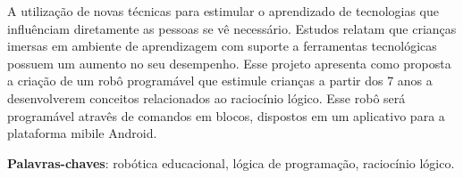 \begin{resumo}
A utilização de novas técnicas para estimular o aprendizado de tecnologias que influênciam diretamente as pessoas se vê necessário. Estudos relatam que crianças imersas em ambiente de aprendizagem com suporte a ferramentas tecnológicas possuem um aumento no seu desempenho. Esse projeto apresenta como proposta a criação de um robô programável que estimule crianças a partir dos 7 anos a desenvolverem conceitos relacionados ao raciocínio lógico. Esse robô será programável atravês de comandos em blocos, dispostos em um aplicativo para a plataforma mibile Android.

 \vspace{\onelineskip}
    
 \noindent
 \textbf{Palavras-chaves}: robótica educacional, lógica de programação, raciocínio lógico.
\end{resumo}
